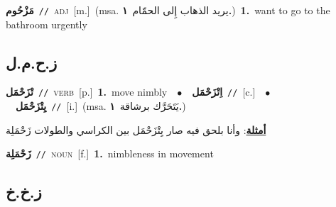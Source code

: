 \documentclass[10pt,a4paper,twoside]{article} %
\begin{document}
\begin{multicols}{2}
{\setlength\topsep{0pt}\textbf{\foreignlanguage{arabic}{مَزْحُوم}}\ {\color{gray}\texttt{//}\color{black}}\ \textsc{adj}\ [m.]\ \color{gray}(msa. \foreignlanguage{arabic}{يريد الذهاب إِلى الحمّام}~\foreignlanguage{arabic}{\textbf{١.}})\color{black}\ \textbf{1.}~want to go to the bathroom urgently\ } \vspace{2mm}

\vspace{-3mm}
\subsection*{\color{blue}\foreignlanguage{arabic}{ز.ح.م.ل}\color{blue}{}} 

{\setlength\topsep{0pt}\textbf{\foreignlanguage{arabic}{تْزَحْمَل}}\ {\color{gray}\texttt{//}\color{black}}\ \textsc{verb}\ [p.]\ \textbf{1.}~move nimbly\ \ $\bullet$\ \ \setlength\topsep{0pt}\textbf{\foreignlanguage{arabic}{اِتْزَحْمَل}}\ {\color{gray}\texttt{//}\color{black}}\ [c.]\ \ $\bullet$\ \ \setlength\topsep{0pt}\textbf{\foreignlanguage{arabic}{يِتْزَحْمَل}}\ {\color{gray}\texttt{//}\color{black}}\ [i.]\ \color{gray}(msa. \foreignlanguage{arabic}{يَتَحَرَّك برشاقة}~\foreignlanguage{arabic}{\textbf{١.}})\color{black}\  \begin{flushright}\color{gray}\foreignlanguage{arabic}{\textbf{\underline{\foreignlanguage{arabic}{أمثلة}}}: وأنا بلحق فيه صار يِتْزَحْمَل بين الكراسي والطولات زَحْمَلِة}\end{flushright}\color{black}} \vspace{2mm}

{\setlength\topsep{0pt}\textbf{\foreignlanguage{arabic}{زَحْمَلِة}}\ {\color{gray}\texttt{//}\color{black}}\ \textsc{noun}\ [f.]\ \textbf{1.}~nimbleness in movement\ } \vspace{2mm}

\vspace{-3mm}
\subsection*{\color{blue}\foreignlanguage{arabic}{ز.خ.خ}\color{blue}{}} 


\end{multicols}
\end{document}
